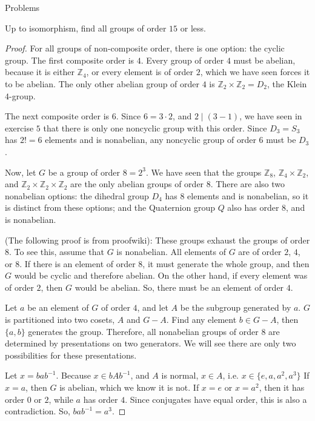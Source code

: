 \documentclass[12pt]{article}
\newcommand{\Z}{\mathbb{Z}}
\theoremstyle{definition}
\newenvironment{problem}[2][Problem]{\begin{trivlist}
\item[\hskip \labelsep {\bfseries #1}\hskip \labelsep {\bfseries #2.}]}{\end{trivlist}}
\begin{document}
\begin{section}{Problems}
\begin{problem}{14}
\end{problem}
\begin{problem}{16}
	Up to isomorphism, find all groups of order $15$ or less.
	\begin{proof}
		For all groups of non-composite order, there is one option: the cyclic group. The first composite order is $4$. Every group of order $4$ must be abelian, because it is either $\Z_4$, or every element is of order $2$, which we have seen forces it to be abelian. The only other abelian group of order $4$ is $\Z_2 \times \Z_2 = D_2$, the Klein $4$-group.
		\par The next composite order is $6$. Since $6 = 3 \cdot 2$, and $2 \mid (3 -1 )$, we have seen in exercise $5$ that there is only one noncyclic group with this order. Since $D_3 = S_3$ has $2! = 6$ elements and is nonabelian, any noncyclic group of order $6$ must be $D_3$.
		\par Now, let $G$ be a group of order $8 = 2^3$. We have seen that the groups $\Z_8$, $\Z_4 \times \Z_2$, and $\Z_2 \times \Z_2 \times \Z_2$ are the only abelian groups of order $8$. There are also two nonabelian options: the dihedral group $D_4$ has $8$ elements and is nonabelian, so it is distinct from these options; and the Quaternion group $Q$ also has order $8$, and is nonabelian.
		\par (The following proof is from proofwiki): These groups exhaust the groups of order $8$. To see this, assume that $G$ is nonabelian. All elements of $G$ are of order $2$, $4$, or $8$. If there is an element of order $8$, it must generate the whole group, and then $G$ would be cyclic and therefore abelian. On the other hand, if every element was of order $2$, then $G$ would be abelian. So, there must be an element of order $4$. 
		\par Let $a$ be an element of $G$ of order $4$, and let $A$ be the subgroup generated by $a$. $G$ is partitioned into two cosets, $A$ and $G - A$. Find any element $b \in G - A$, then $\{a,b\}$ generates the group. Therefore, all nonabelian groups of order $8$ are determined by presentations on two generators. We will see there are only two possibilities for these presentations.
		\par Let $x = bab^{-1}$. Because $x \in bAb^{-1}$, and $A$ is normal, $x \in A$, i.e. $x \in \{e,a,a^2,a^3\}$ If $x = a$, then $G$ is abelian, which we know it is not. If $x = e$ or $x = a^2$, then it has order $0$ or $2$, while $a$ has order $4$. Since conjugates have equal order, this is also a contradiction. So, $bab^{-1} = a^3$.

\end{proof}
\end{problem}
\end{section}
\end{document}
